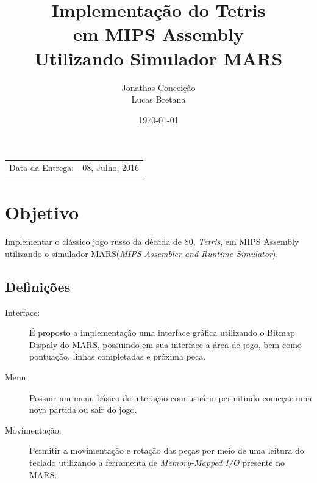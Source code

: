 \documentclass{article}
\title{Implementação do Tetris \\ em MIPS Assembly \\ Utilizando Simulador MARS} %
\author{Jonathas Conceição \\ Lucas Bretana} %
\date{\today} %
\begin{document}
\maketitle %

\begin{center}
\begin{tabular}{l r}
Data da Entrega: & 08, Julho, 2016 \\ %
\end{tabular}
\end{center}



\section{Objetivo}

Implementar o clássico jogo russo da década de 80, \textit{Tetris}, em MIPS Assembly utilizando o simulador MARS(\textit{MIPS Assembler and Runtime Simulator}).




\subsection{Definições} \label{definitions}
\begin{description}
  \item[Interface:]
    É proposto a implementação uma interface gráfica utilizando o Bitmap Dispaly do MARS, possuindo em sua interface a área de jogo, bem como pontuação, linhas completadas e próxima peça.
  \item[Menu:]
    Possuir um menu básico de interação com usuário permitindo começar uma nova partida ou sair do jogo.
  \item[Movimentação:]
    Permitir a movimentação e rotação das peças por meio de uma leitura do teclado utilizando a ferramenta de \textit{Memory-Mapped I/O} presente no MARS.
\end{description}
\end{document}
